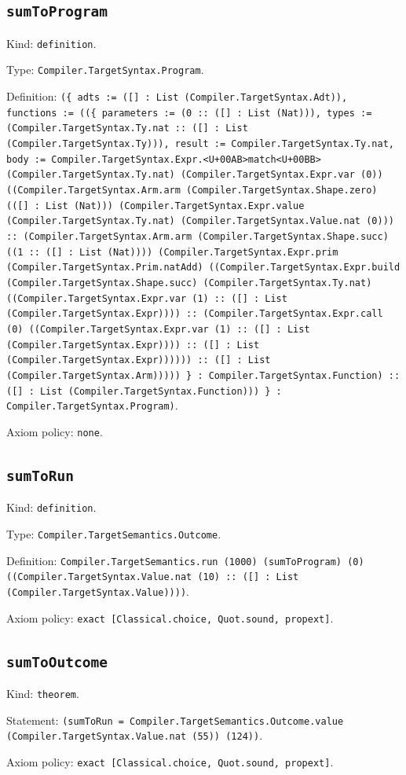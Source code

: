 \documentclass[11pt]{article}
\begin{document}
\subsection*{\texttt{sumToProgram}}
\noindent Kind: \texttt{definition}.\par
\noindent Type: \texttt{Compiler.TargetSyntax.Program}.\par
\noindent Definition: \texttt{(\{ adts := ([] : List (Compiler.TargetSyntax.Adt)), functions := ((\{ parameters := (0 :: ([] : List (Nat))), types := (Compiler.TargetSyntax.Ty.nat :: ([] : List (Compiler.TargetSyntax.Ty))), result := Compiler.TargetSyntax.Ty.nat, body := Compiler.TargetSyntax.Expr.<U+00AB>match<U+00BB> (Compiler.TargetSyntax.Ty.nat) (Compiler.TargetSyntax.Expr.var (0)) ((Compiler.TargetSyntax.Arm.arm (Compiler.TargetSyntax.Shape.zero) (([] : List (Nat))) (Compiler.TargetSyntax.Expr.value (Compiler.TargetSyntax.Ty.nat) (Compiler.TargetSyntax.Value.nat (0))) :: (Compiler.TargetSyntax.Arm.arm (Compiler.TargetSyntax.Shape.succ) ((1 :: ([] : List (Nat)))) (Compiler.TargetSyntax.Expr.prim (Compiler.TargetSyntax.Prim.natAdd) ((Compiler.TargetSyntax.Expr.build (Compiler.TargetSyntax.Shape.succ) (Compiler.TargetSyntax.Ty.nat) ((Compiler.TargetSyntax.Expr.var (1) :: ([] : List (Compiler.TargetSyntax.Expr)))) :: (Compiler.TargetSyntax.Expr.call (0) ((Compiler.TargetSyntax.Expr.var (1) :: ([] : List (Compiler.TargetSyntax.Expr)))) :: ([] : List (Compiler.TargetSyntax.Expr)))))) :: ([] : List (Compiler.TargetSyntax.Arm))))) \} : Compiler.TargetSyntax.Function) :: ([] : List (Compiler.TargetSyntax.Function))) \} : Compiler.TargetSyntax.Program)}.\par
\noindent Axiom policy: \texttt{none}.\par
\subsection*{\texttt{sumToRun}}
\noindent Kind: \texttt{definition}.\par
\noindent Type: \texttt{Compiler.TargetSemantics.Outcome}.\par
\noindent Definition: \texttt{Compiler.TargetSemantics.run (1000) (sumToProgram) (0) ((Compiler.TargetSyntax.Value.nat (10) :: ([] : List (Compiler.TargetSyntax.Value))))}.\par
\noindent Axiom policy: \texttt{exact [Classical.choice, Quot.sound, propext]}.\par
\subsection*{\texttt{sumToOutcome}}
\noindent Kind: \texttt{theorem}.\par
\noindent Statement: \texttt{(sumToRun = Compiler.TargetSemantics.Outcome.value (Compiler.TargetSyntax.Value.nat (55)) (124))}.\par
\noindent Axiom policy: \texttt{exact [Classical.choice, Quot.sound, propext]}.\par
\end{document}
